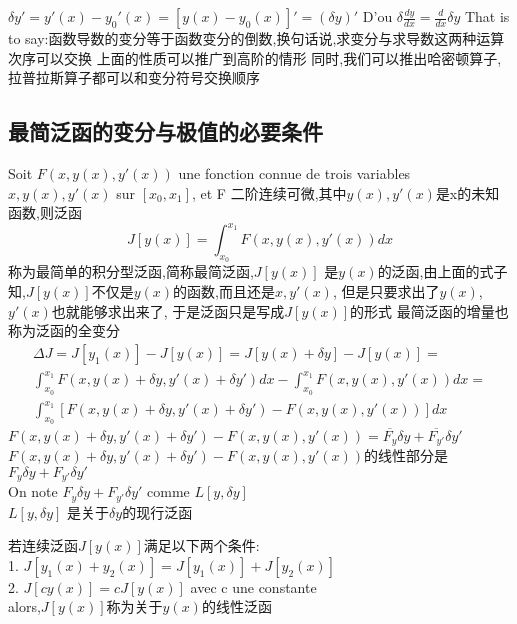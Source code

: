 $\delta y'=y'(x)-y_0'(x)=[y(x)-y_0(x)]'=(\delta y)'$
D'ou $\delta \frac{dy}{dx}=\frac{d}{dx}\delta y$
\newline
That is to say:函数导数的变分等于函数变分的倒数,换句话说,求变分与求导数这两种运算次序可以交换
\newline
上面的性质可以推广到高阶的情形
同时,我们可以推出哈密顿算子,拉普拉斯算子都可以和变分符号交换顺序

\subsection{最简泛函的变分与极值的必要条件}
Soit $F(x,y(x),y'(x))$ une fonction connue de trois variables $x,y(x),y'(x)$ sur $[x_0,x_1]$, et F 二阶连续可微,其中$y(x),y'(x)$是x的未知函数,则泛函 \newline
$$J[y(x)]=\int_{x_0}^{x_1}F(x,y(x),y'(x))dx$$
称为最简单的积分型泛函,简称最简泛函,$J[y(x)]$ 是$y(x)$的泛函,由上面的式子知,$J[y(x)]$不仅是$y(x)$的函数,而且还是$x,y'(x)$, 但是只要求出了$y(x)$, $y'(x)$也就能够求出来了, 于是泛函只是写成$J[y(x)]$的形式
\newline
最简泛函的增量也称为泛函的全变分
\begin{equation}
\begin{split}
  \Delta J=J[y_1(x)]-J[y(x)]=J[y(x)+\delta y]-J[y(x)]= \\
\int_{x_0}^{x_1}F(x,y(x)+\delta y,y'(x)+\delta y')dx-\int_{x_0}^{x_1}F(x,y(x),y'(x))dx = \\
\int_{x_0}^{x_1}[F(x,y(x)+\delta y,y'(x)+\delta y')-F(x,y(x),y'(x))]dx
 \end{split}
\end{equation}
$F(x,y(x)+\delta y,y'(x)+\delta y')-F(x,y(x),y'(x))=\overline{F_y}\delta y + \overline{F_{y'}}\delta y'$ \newline
$F(x,y(x)+\delta y,y'(x)+\delta y')-F(x,y(x),y'(x))$的线性部分是$F_y\delta y + F_{y'}\delta y'$ \\
On note $F_y\delta y + F_{y'}\delta y'$ comme $L[y,\delta y]$ \\
$L[y,\delta y]$ 是关于$\delta y$的现行泛函

\begin{definition}
若连续泛函$J[y(x)]$满足以下两个条件:\\
1. $J[y_1(x)+y_2(x)]=J[y_1(x)]+J[y_2(x)]$ \\
2. $J[cy(x)]=cJ[y(x)]$ avec c une constante\\
alors,$J[y(x)]$称为关于$y(x)$的线性泛函
\end{definition}


